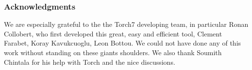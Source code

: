 \documentclass{article} %
\begin{document}

%


\subsubsection*{Acknowledgments}
We are especially grateful to the the Torch7 developing team, in particular Ronan Collobert, who first developed this great, easy and efficient tool, Clement Farabet, Koray Kavukcuoglu, Leon Bottou. We could not have done any of this work without standing on these giants shoulders. We also thank Soumith Chintala for his help with Torch and the nice discussions.



\end{document}
